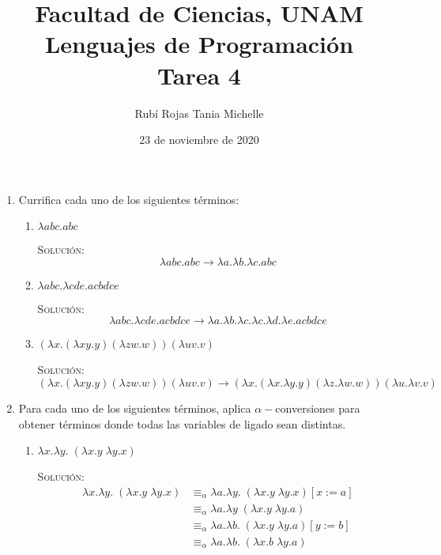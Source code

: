 \documentclass[letterpaper,11pt]{article}
\title{Facultad de Ciencias, UNAM \\ 
       Lenguajes de Programación \\ 
       Tarea 4}
\author{Rubí Rojas Tania Michelle}
\date{23 de noviembre de 2020}
\begin{document}
\maketitle

\begin{enumerate}
    \item Currifica cada uno de los siguientes términos:
    \begin{enumerate}
        \item $\lambda abc.abc$

        \textsc{Solución:}
        \begin{equation*}
            \lambda abc.abc \rightarrow 
            \lambda a. \lambda b. \lambda c.abc
        \end{equation*}

        \item $\lambda abc. \lambda cde.acbdce$
        
        \textsc{Solución:}
        \begin{equation*}
            \lambda abc. \lambda cde.acbdce \rightarrow
            \lambda a. \lambda b. \lambda c. \lambda c. \lambda d. 
            \lambda e.acbdce
        \end{equation*}

        \item $(\lambda x.(\lambda xy.y) (\lambda zw.w)) (\lambda uv.v)$

        \textsc{Solución:}
        \begin{equation*}
            (\lambda x.(\lambda xy.y) (\lambda zw.w)) (\lambda uv.v) \rightarrow
            (\lambda x. (\lambda x. \lambda y. y) (\lambda z. \lambda w.w))
            (\lambda u. \lambda v.v)
        \end{equation*}
    \end{enumerate}

    \item Para cada uno de los siguientes términos, aplica $\alpha-$conversiones
    para obtener términos donde todas las variables de ligado sean distintas.
    \begin{enumerate}
        \item $\lambda x. \lambda y. \; (\lambda x.y \; \lambda y.x)$

        \textsc{Solución:}
        \begin{align*}
            \lambda x. \lambda y. \; (\lambda x.y \; \lambda y.x)
            &\equiv_{\alpha}
            \lambda a. \lambda y. \;(\lambda x.y \; \lambda y.x) [x := a] \\
            &\equiv_{\alpha} 
            \lambda a. \lambda y \; (\lambda x.y \; \lambda y.a) \\
            &\equiv_{\alpha}
            \lambda a. \lambda b. \; (\lambda x.y \; \lambda y.a) [y := b] \\
            &\equiv_{\alpha}
            \lambda a. \lambda b. \; (\lambda x.b \; \lambda y.a) 
        \end{align*}


\end{enumerate}
\end{enumerate}
\end{document}
